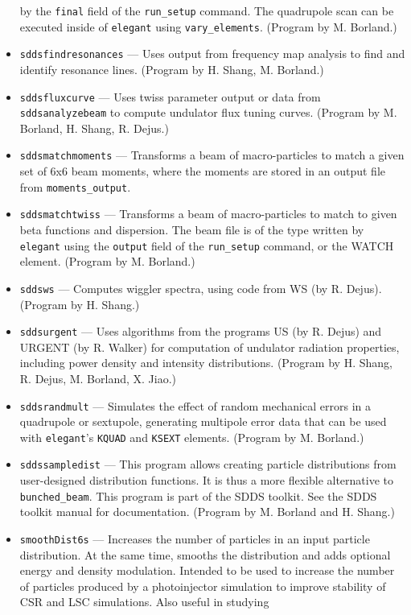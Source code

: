 \documentclass[11pt]{article}
\begin{document}
\begin{itemize}
        by the {\tt final} field of the {\tt run\_setup} command.  The quadrupole scan can be
        executed inside of {\tt elegant} using {\tt vary\_elements}. (Program by M. Borland.)
\item {\tt sddsfindresonances} --- Uses output from frequency map analysis to find and identify resonance lines.
 (Program by H. Shang, M. Borland.)
\item {\tt sddsfluxcurve} --- Uses twiss parameter output or data from {\tt sddsanalyzebeam} to
  compute undulator flux tuning curves.  (Program by M. Borland, H. Shang, R. Dejus.)
\item {\tt sddsmatchmoments} --- Transforms a beam of macro-particles to match a given set of 
  6x6 beam moments, where the moments are stored in an output file from \verb|moments_output|.
\item {\tt sddsmatchtwiss} --- Transforms a beam of macro-particles to match to given beta
        functions and dispersion.    The beam file
        is of the type written by {\tt elegant} using the {\tt output} field of the {\tt run\_setup}
        command, or the WATCH element. (Program by M. Borland.)
\item {\tt sddsws} --- Computes wiggler spectra, using code from WS (by R. Dejus).
  (Program by H. Shang.)
\item {\tt sddsurgent} --- Uses algorithms from the programs US (by R. Dejus) and URGENT (by R. Walker) for computation of undulator
  radiation properties, including power density and intensity distributions.  (Program by H. Shang, R. Dejus, M. Borland, X. Jiao.)
\item {\tt sddsrandmult} --- Simulates the effect of random mechanical errors in a quadrupole or sextupole,
  generating multipole error data that can be used with {\tt elegant}'s {\tt KQUAD} and {\tt KSEXT}
  elements. (Program by M. Borland.)
\item {\tt sddssampledist} --- This program allows creating particle
        distributions from user-designed distribution functions.  It is thus a more flexible alternative
        to \verb|bunched_beam|.  This program is part of the SDDS toolkit.  See the SDDS toolkit
        manual for documentation.  (Program by M. Borland and H. Shang.)
\item {\tt smoothDist6s} --- Increases the number of particles in an input particle distribution.  At the same
 time, smooths the distribution and adds optional energy and density modulation.   Intended to be used to increase the number of particles
 produced by a photoinjector simulation to improve stability of CSR and LSC simulations.  Also useful in studying 

\end{itemize}
\end{document}
